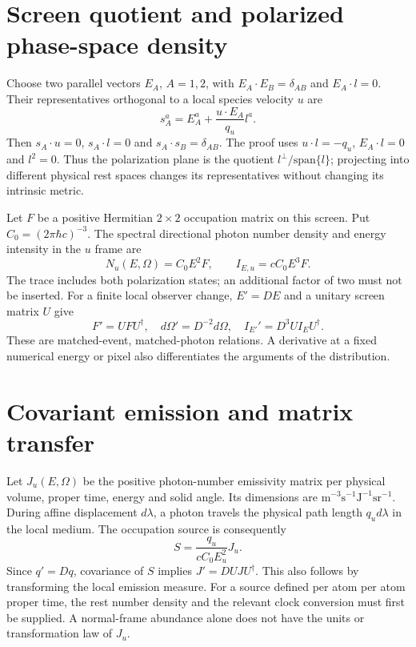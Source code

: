 \section{Screen quotient and polarized phase-space density}
Choose two parallel vectors $E_A$, $A=1,2$, with $E_A\cdot E_B=\delta_{AB}$ and $E_A\cdot l=0$. Their representatives orthogonal to a local species velocity $u$ are
\begin{equation}\label{vii:physical_screen}
s_A^a=E_A^a+\frac{u\cdot E_A}{q_u}l^a.
\end{equation}
Then $s_A\cdot u=0$, $s_A\cdot l=0$ and $s_A\cdot s_B=\delta_{AB}$. The proof uses $u\cdot l=-q_u$, $E_A\cdot l=0$ and $l^2=0$. Thus the polarization plane is the quotient $l^\perp/\mathrm{span}\{l\}$; projecting into different physical rest spaces changes its representatives without changing its intrinsic metric.

Let $F$ be a positive Hermitian $2\times2$ occupation matrix on this screen. Put $C_0=(2\pi\hbar c)^{-3}$. The spectral directional photon number density and energy intensity in the $u$ frame are
\begin{equation}\label{vii:occupation_intensity}
N_u(E,\Omega)=C_0 E^2F,\qquad I_{E,u}=cC_0E^3F.
\end{equation}
The trace includes both polarization states; an additional factor of two must not be inserted. For a finite local observer change, $E'=DE$ and a unitary screen matrix $U$ give
\begin{equation}\label{vii:finite_radiance}
F'=UFU^\dagger,\quad d\Omega'=D^{-2}d\Omega,\quad
I_{E'}'=D^3UI_EU^\dagger.
\end{equation}
These are matched-event, matched-photon relations. A derivative at a fixed numerical energy or pixel also differentiates the arguments of the distribution.

\section{Covariant emission and matrix transfer}
Let $J_u(E,\Omega)$ be the positive photon-number emissivity matrix per physical volume, proper time, energy and solid angle. Its dimensions are $\mathrm{m}^{-3}\mathrm{s}^{-1}\mathrm{J}^{-1}\mathrm{sr}^{-1}$. During affine displacement $d\lambda$, a photon travels the physical path length $q_u d\lambda$ in the local medium. The occupation source is consequently
\begin{equation}\label{vii:affine_source}
S=\frac{q_u}{cC_0E_u^2}J_u.
\end{equation}
Since $q'=Dq$, covariance of $S$ implies $J'=DUJU^\dagger$. This also follows by transforming the local emission measure. For a source defined per atom per atom proper time, the rest number density and the relevant clock conversion must first be supplied. A normal-frame abundance alone does not have the units or transformation law of $J_u$.

